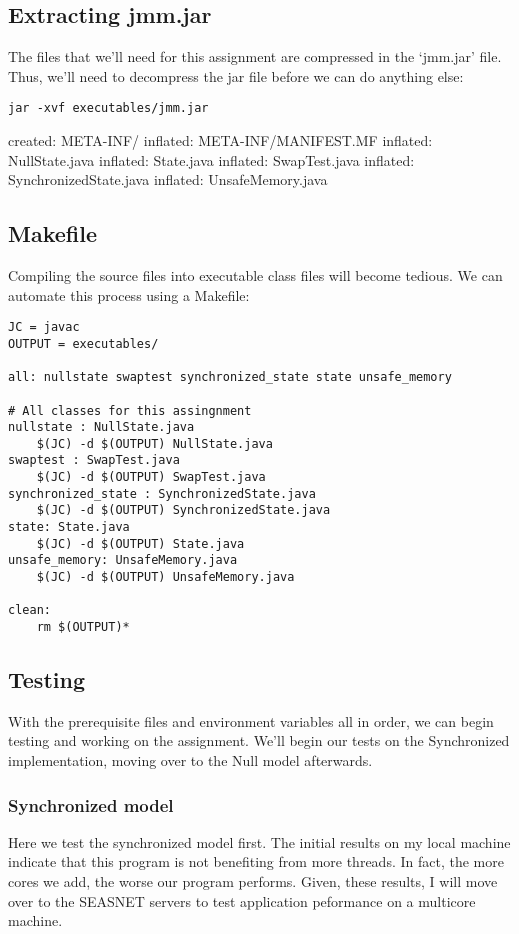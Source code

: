 \documentclass[11pt]{article}
\begin{document}
\subsection{Extracting jmm.jar}
\label{sec-2-1}
The files that we'll need for this assignment are compressed in 
the `jmm.jar' file. Thus, we'll need to decompress the jar file
before we can do anything else:

\begin{verbatim}
jar -xvf executables/jmm.jar
\end{verbatim}
created:   META-INF/              
inflated:  META-INF/MANIFEST.MF   
inflated:  NullState.java         
inflated:  State.java             
inflated:  SwapTest.java          
inflated:  SynchronizedState.java 
inflated:  UnsafeMemory.java      
\subsection{Makefile}
\label{sec-2-2}
Compiling the source files into executable class files will become tedious.
We can automate this process using a Makefile:

\begin{verbatim}
JC = javac
OUTPUT = executables/

all: nullstate swaptest synchronized_state state unsafe_memory

# All classes for this assingnment
nullstate : NullState.java
	$(JC) -d $(OUTPUT) NullState.java
swaptest : SwapTest.java
	$(JC) -d $(OUTPUT) SwapTest.java
synchronized_state : SynchronizedState.java
	$(JC) -d $(OUTPUT) SynchronizedState.java
state: State.java
	$(JC) -d $(OUTPUT) State.java
unsafe_memory: UnsafeMemory.java
	$(JC) -d $(OUTPUT) UnsafeMemory.java

clean:
	rm $(OUTPUT)*
\end{verbatim}
\subsection{Testing}
\label{sec-2-3}
With the prerequisite files and environment variables all in order, we
can begin testing and working on the assignment. We'll begin our tests
on the Synchronized implementation, moving over to the Null model
afterwards.
\subsubsection{Synchronized model}
\label{sec-2-3-1}
Here we test the synchronized model first. The initial results on my
local machine indicate that this program is not benefiting from more
threads. In fact, the more cores we add, the worse our program
performs. Given, these results, I will move over to the SEASNET
servers to test application peformance on a multicore machine.
\end{document}
